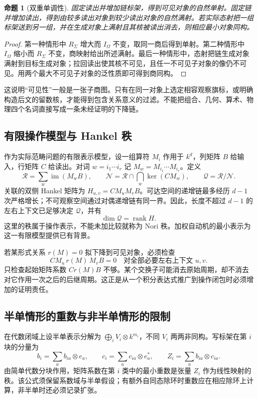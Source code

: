 \documentclass[11pt,a4paper,oneside]{ctexart}
\theoremstyle{cnplain}
\newtheorem{proposition}[theorem]{命题}
\theoremstyle{definition}
\theoremstyle{remark}
\newcommand{\rank}{\operatorname{rank}}
\newcommand{\im}{\operatorname{im}}
\numberwithin{equation}{section}
\begin{document}
\begin{proposition}[双重单调性]\label{prop:visible}
固定读出并增加链标架，得到可见对象的自然单射。固定链并增加读出，得到由较多读出对象到较少读出对象的自然满射。若实际态射把一组标架送到另一组，并在生成对象上满射且其核被读出消去，则相应最小对象同构。
\end{proposition}
\begin{proof}
第一种情形中 $R_\Sigma$ 增大而 $I_\Omega$ 不变，取同一商后得到单射。第二种情形中 $I_\Omega$ 缩小而 $R_\Sigma$ 不变，商映射给出所述满射。最后一种情形中，态射把链生成对象满射到目标生成对象；拉回读出使其核不可见，且任一不可见子对象的像仍不可见。用两个最大不可见子对象的泛性质即可得到商同构。
\end{proof}

这说明``可见性''一般是一张子商图。只有在同一对象上选定相容观察旗标，或明确构造后文的留数核，才能得到包含关系意义的过滤。不能把组合、几何、算术、物理四个名词直接写成一条未经证明的下降链。


\subsection{有限操作模型与 Hankel 秩}
作为实际范畴问题的有限表示模型，设一组算符 $M_i$ 作用于 $k^d$，列矩阵 $B$ 给输入，行矩阵 $C$ 给读出。对词 $w=i_1\cdots i_r$ 记 $M_w=M_{i_1}\cdots M_{i_r}$。定义
\begin{equation}
 \mathcal R=\sum_w\im(M_wB),\qquad
 \mathcal N=\mathcal R\cap\bigcap_w\ker(CM_w),\qquad
 \mathcal Q=\mathcal R/\mathcal N.
\end{equation}
关联的双侧 Hankel 矩阵为 $H_{u,v}=CM_uM_vB$。可达空间的递增链最多经历 $d-1$ 次严格增长；不可观察空间通过对偶递增链有同一界。因此，长度不超过 $d-1$ 的左右上下文已足够决定 $\mathcal Q$，并有
\begin{equation}\label{eq:hankel}
 \dim\mathcal Q=\rank H.
\end{equation}
这里的秩属于操作表示，不能未加比较就称为 Nori 秩。加权自动机的最小表示为这一有限模型提供已有背景\cite{kiefer}。

若某形式关系 $r(M)=0$ 拟下降到可见对象，必须检查
\begin{equation}
 CM_u\,r(M)\,M_vB=0
 \quad\text{对全部必要左右上下文 }u,v.
\end{equation}
只检查起始矩阵系数 $Cr(M)B$ 不够。某个交换子可能消去原始周期，却不消去对它作用一次之后的后继周期。这正是从一个积分表达式推广到操作闭包时必须增加的证明责任。


\subsection{半单情形的重数与非半单情形的限制}
在代数闭域上设半单表示分解为 $\bigoplus_i V_i\otimes k^{m_i}$，不同 $V_i$ 两两非同构。写标架在第 $i$ 块的分量为
\begin{equation}
 b_i=\sum_a b_{ia}\otimes e_a,\qquad
 c_i=\sum_a c_{ia}\otimes e_a^*,\qquad
 Z_i=\sum_a b_{ia}\otimes c_{ia}.
\end{equation}
由简单代数分块作用，矩阵系数在第 $i$ 类中的最小重数是张量 $Z_i$ 作为线性映射的秩。该公式须保留系数域与半单假设；有额外自同态除环时重数应在相应除环上计算，非半单时还必须记录扩张。
\end{document}
